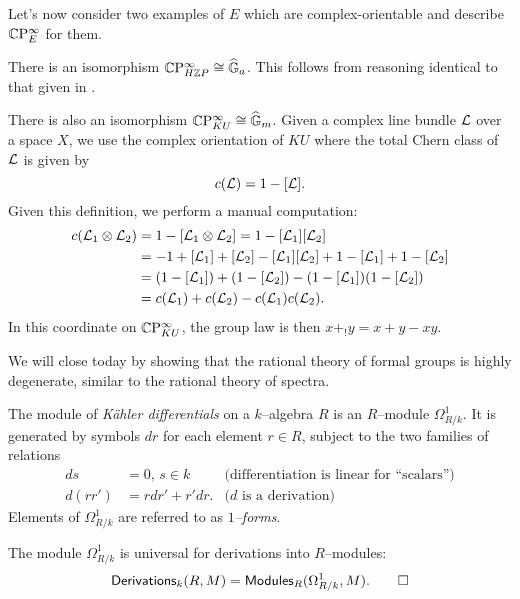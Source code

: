 Let's now consider two examples of $E$ which are complex-orientable and describe $\mathbb{C}\mathrm P^\infty_E$ for them.

\begin{example}
There is an isomorphism $\mathbb{C}\mathrm P^\infty_{H\mathbb Z P} \cong \widehat{\mathbb G}_a$.  This follows from reasoning identical to that given in .
\end{example}

\begin{example}
There is also an isomorphism $\mathbb{C}\mathrm P^\infty_{KU} \cong \widehat{\mathbb G}_m$.  Given a complex line bundle $\mathcal{L}$ over a space $X$, we use the complex orientation of $KU$ where the total Chern class of $\mathcal{L}$ is given by \[c(\mathcal{L}) = 1 - [\mathcal{L}].\]  Given this definition, we perform a manual computation:
\begin{align*}
c(\mathcal{L}_1 \otimes \mathcal{L}_2) & = 1 - [\mathcal{L}_1 \otimes \mathcal{L}_2] = 1 - [\mathcal{L}_1] [\mathcal{L}_2] \\
& = -1 + [\mathcal{L}_1] + [\mathcal{L}_2] - [\mathcal{L}_1] [\mathcal{L}_2] + 1 - [\mathcal{L}_1] + 1 - [\mathcal{L}_2] \\
& = (1 - [\mathcal{L}_1]) + (1 - [\mathcal{L}_2]) - (1 - [\mathcal{L}_1])(1 - [\mathcal{L}_2]) \\
& = c(\mathcal{L}_1) + c(\mathcal{L}_2) - c(\mathcal{L}_1) c(\mathcal{L}_2).
\end{align*}
In this coordinate on $\mathbb{C}\mathrm P^\infty_{KU}$, the group law is then $x +_! y = x + y - xy$. 
\end{example}

We will close today by showing that the rational theory of formal groups is highly degenerate, similar to the rational theory of spectra.

\begin{definition}
The module of \textit{K\"ahler differentials} on a $k$--algebra $R$ is an $R$--module $\Omega^1_{R/k}$.  It is generated by symbols $dr$ for each element $r \in R$, subject to the two families of relations
\begin{align*}
ds & = 0, \, s \in k & \text{(differentiation is linear for ``scalars'')} \\
d(rr') & = rdr' + r'dr. & \text{($d$ is a derivation)}
\end{align*}
Elements of $\Omega^1_{R/k}$ are referred to as \textit{$1$--forms}.
\end{definition}

\begin{lemma}
The module $\Omega^1_{R/k}$ is universal for derivations into $R$--modules: \[\mathsf{Derivations}_k(R, M) = \mathsf{Modules}_R(\Omega^1_{R/k}, M). \qed\]
\end{lemma}

